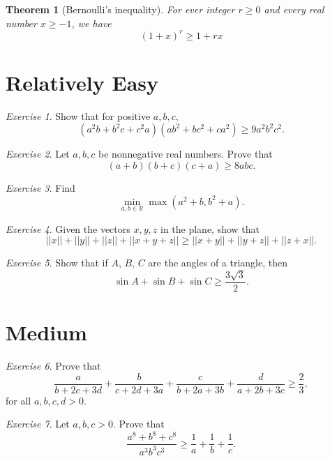 \documentclass{article}
\newtheorem{theorem}{Theorem}[section]
\theoremstyle{definition}
\theoremstyle{remark}
\newtheorem{exercise}{Exercise}
\begin{document}
\begin{theorem}[Bernoulli's inequality]
For ever integer $r \geq 0$ and every real number $x \geq -1$, we have 
\begin{equation}
    (1 + x)^{r} \geq 1 + rx 
\end{equation}
\end{theorem}


\section{Relatively Easy}
\begin{exercise}
Show that for positive $a, b, c,$
\[(a^{2}b + b^{2}c + c^{2}a)(ab^{2} + bc^{2} + ca^{2}) \geq 9a^{2}b^{2}c^{2}. 
\]
\end{exercise}

\begin{exercise}
Let $a, b, c$ be nonnegative real numbers. Prove that 
\[(a + b)(b + c)(c + a) \geq 8abc. 
\]
\end{exercise}

\begin{exercise}
Find 
\[\underset{a, b \in \mathbb{R}}{\min} \max(a^{2} + b, b^{2} + a). 
\]
\end{exercise}

\begin{exercise}
Given the vectors $x, y, z$ in the plane, show that 
\[||x|| + ||y|| + ||z|| +||x + y + z|| \geq ||x + y|| + ||y + z|| +||z + x||. 
\]
\end{exercise}

\begin{exercise}
Show that if $A$, $B$, $C$ are the angles of a triangle, then 
\[
\sin{A} +\sin{B} + \sin{C} \geq \frac{3\sqrt{3}}{2}. 
\]
\end{exercise}

\section{Medium}
\begin{exercise}
Prove that 
\[\frac{a}{b + 2c + 3d} + \frac{b}{c + 2d + 3a} + \frac{c}{b + 2a + 3b} + \frac{d}{a + 2b + 3c} \geq \frac{2}{3},
\]
for all $a, b, c, d > 0$. 
\end{exercise}

\begin{exercise}
Let $a, b, c > 0$. Prove that 
\[\frac{a^{8} + b^{8} + c^{8}}{a^{3}b^{3}c^{3}} \geq \frac{1}{a} + \frac{1}{b} + \frac{1}{c}. 
\]
\end{exercise}
\end{document}
